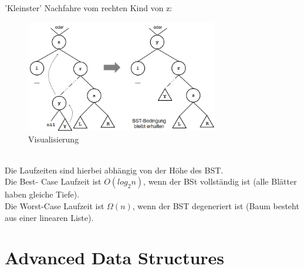 \documentclass{article}
\begin{document}
            'Kleinster' Nachfahre vom rechten Kind von z: \\
            \begin{figure}[ht]
                \centering
                \includegraphics[width=0.75\textwidth]{Bilder/BSTdel3.png}
                \caption{Visualisierung}
                \label{fig:BSTdel3}
            \end{figure}\\
            \newpage
            Die Laufzeiten sind hierbei abhängig von der Höhe des BST. \\
            Die Best- Case Laufzeit ist $O(log_2n)$, wenn der BSt vollständig ist (alle Blätter haben gleiche Tiefe).\\
            Die Worst-Case Laufzeit ist $\Omega(n)$, wenn der BST degeneriert ist (Baum besteht aus einer linearen Liste).\\

    \newpage
    \section{Advanced Data Structures}
\end{document}
